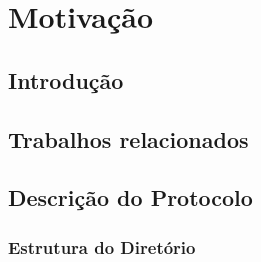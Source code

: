 \chapter{Motivação}
\label{chap:estado-da-arte}
% 

\section{Introdução}
\label{chap2:sec:intro}








\section{Trabalhos relacionados}


\section{Descrição do Protocolo}




\subsection{Estrutura do Diretório}
\begin{comment}
     elementos
     - Nodes
    vértices do grafo
     

     - Ligações entre os nodes (ligação de finds e ligação do MyChan, ver ARVY)
     explicar porque é que as ligações viram
     - envios do obj são diretos
\end{comment}

